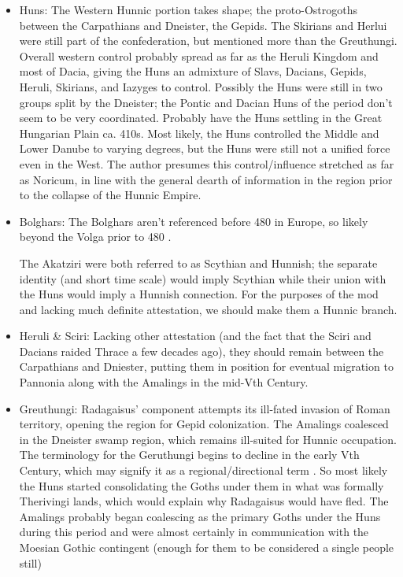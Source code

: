 \documentclass{article}
\begin{document}
	\begin{itemize}
		\item Huns:\newline
		The Western Hunnic portion takes shape; the proto-Ostrogoths between the Carpathians and Dneister, the Gepids.
		The Skirians and Herlui were still part of the confederation, but mentioned more than the Greuthungi.
		Overall western control probably spread as far as the Heruli Kingdom and most of Dacia, giving the Huns an admixture of Slavs, Dacians, Gepids, Heruli, Skirians, and Iazyges to control.
		Possibly the Huns were still in two groups split by the Dneister; the Pontic and Dacian Huns of the period don't seem to be very coordinated.
		Probably have the Huns settling in the Great Hungarian Plain ca. 410s.
		Most likely, the Huns controlled the Middle and Lower Danube to varying degrees, but the Huns were still not a unified force even in the West.
		The author presumes this control/influence stretched as far as Noricum, in line with the general dearth of information in the region prior to the collapse of the Hunnic Empire.
		
		\item Bolghars:\newline
		The Bolghars aren't referenced before 480 in Europe, so likely beyond the Volga prior to 480 \cite{KimHuns}.
		
		The Akatziri were both referred to as Scythian and Hunnish; the separate identity (and short time scale) would imply Scythian while their union with the Huns would imply a Hunnish connection.
		For the purposes of the mod and lacking much definite attestation, we should make them a Hunnic branch.
		
		\item Heruli \& Sciri:\newline
		Lacking other attestation (and the fact that the Sciri and Dacians raided Thrace a few decades ago), they should remain between the Carpathians and Dniester, putting them in position for eventual migration to Pannonia along with the Amalings in the mid-Vth Century.
		
		\item Greuthungi:\newline
		Radagaisus' component attempts its ill-fated invasion of Roman territory, opening the region for Gepid colonization.
		The Amalings coalesced in the Dneister swamp region, which remains ill-suited for Hunnic occupation.
		The terminology for the Geruthungi begins to decline in the early Vth Century, which may signify it as a regional/directional term \cite{WolframHistoryOfTheGoths}.
		So most likely the Huns started consolidating the Goths under them in what was formally Therivingi lands, which would explain why Radagaisus would have fled.
		The Amalings probably began coalescing as the primary Goths under the Huns during this period and were almost certainly in communication with the Moesian Gothic contingent (enough for them to be considered a single people still)
		

\end{itemize}
\end{document}

